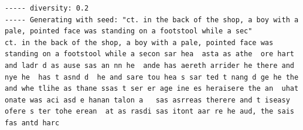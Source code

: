 \documentclass{article}[]
\begin{document}
\begin{lstlisting}[label=harry-gru-gibberish, caption={script with GRU and with Harry Potter as input after 2 epoch and a diversity of 0.2 and a loss value of arround 2.4}]
----- diversity: 0.2
----- Generating with seed: "ct. in the back of the shop, a boy with a pale, pointed face was standing on a footstool while a sec"
ct. in the back of the shop, a boy with a pale, pointed face was standing on a footstool while a secon sar hea  asta as athe  ore hart and ladr d as ause sas an nn he  ande has aereth arrider he there and nye he  has t asnd d  he and sare tou hea s sar ted t nang d ge he the and whe tlihe as thane ssas t ser er age ine es heraisere the an  uhat onate was aci asd e hanan talon a   sas asrreas therere and t iseasy  ofere s ter tohe erean  at as rasdi sas itont aar re he aud, the sais fas antd harc
\end{lstlisting}

 

\end{document}

